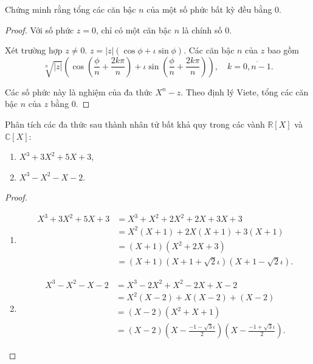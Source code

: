 \begin{exercise}
    Chứng minh rằng tổng các căn bậc $n$ của một số phức bất kỳ đều bằng $0$.
\end{exercise}

\begin{proof}
    Với số phức $z = 0$, chỉ có một căn bậc $n$ là chính số $0$.
    
    Xét trường hợp $z\ne 0$. $z = |z|(\cos\phi + \iota\sin\phi)$. Các căn bậc $n$ của $z$ bao gồm
    \[
        \sqrt[n]{|z|}\left(\cos\left(\frac{\phi}{n} + \frac{2k\pi}{n}\right) + \iota\sin\left(\frac{\phi}{n} + \frac{2k\pi}{n}\right)\right),\quad k = \overline{0, n-1}.
    \]

    Các số phức này là nghiệm của đa thức $X^{n} - z$. Theo định lý Viete, tổng các căn bậc $n$ của $z$ bằng $0$.
\end{proof}

\begin{exercise}Phân tích các đa thức sau thành nhân tử bất khả quy trong các vành $\mathbb{R}[X]$ và $\mathbb{C}[X]$:
    \begin{enumerate}[label = (\alph*)]
        \item $X^{3} + 3X^{2} + 5X + 3$,
        \item $X^{3} - X^{2} - X - 2$.
    \end{enumerate}
\end{exercise}

\begin{proof}
    \begin{enumerate}[label = (\alph*)]
        \item
              \begin{align*}
                  X^{3} + 3X^{2} + 5X + 3 & = X^{3} + X^{2} + 2X^{2} + 2X + 3X + 3                  \\
                                          & = X^{2}(X + 1) + 2X(X + 1) + 3(X + 1)                   \\
                                          & = (X + 1)(X^{2} + 2X + 3)                               \\
                                          & = (X + 1)(X + 1 + \sqrt{2}\iota)(X + 1 - \sqrt{2}\iota).
              \end{align*}
        \item
              \begin{align*}
                  X^{3} - X^{2} - X - 2 & = X^{3} - 2X^{2} + X^{2} - 2X + X - 2                                         \\
                                        & = X^{2}(X - 2) + X(X - 2) + (X - 2)                                           \\
                                        & = (X - 2)(X^{2} + X + 1)                                                      \\
                                        & = (X - 2)\left(X - \frac{-1 - \sqrt{3}\iota}{2}\right)\left(X - \frac{-1 + \sqrt{3}\iota}{2}\right).
              \end{align*}
    \end{enumerate}
\end{proof}

